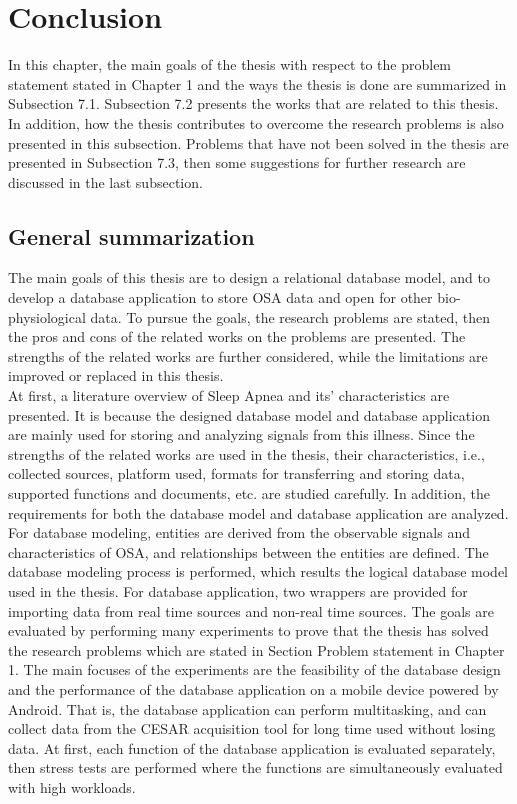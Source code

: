 
\chapter{Conclusion}%

\label{Chapter7} %
In this chapter, the main goals of the thesis with respect to the problem statement stated in Chapter 1 and the ways the thesis is done are summarized in Subsection 7.1. Subsection 7.2 presents the works that are related to this thesis. In addition, how the thesis contributes to overcome the research problems is also presented in this subsection. Problems that have not been solved in the thesis are presented in Subsection 7.3, then some suggestions for further research are discussed in the last subsection.

\section{General summarization}
The main goals of this thesis are to design a relational database model, and to develop a database application to store OSA data and open for other bio-physiological data. To pursue the goals, the research problems are stated, then the pros and cons of the related works on the problems are presented. The strengths of the related works are further considered, while the limitations are improved or replaced in this thesis.\\
At first, a literature overview of Sleep Apnea and its’ characteristics are presented. It is because the designed database model and database application are mainly used for storing and analyzing signals from this illness. Since the strengths of the related works are used in the thesis, their characteristics, i.e., collected sources, platform used, formats for transferring and storing data, supported functions and documents, etc. are studied carefully. In addition, the requirements for both the database model and database application are analyzed. For database modeling, entities are derived from the observable signals and characteristics of OSA, and relationships between the entities are defined. The database modeling process is performed, which results the logical database model used in the thesis. For database application, two wrappers are provided for importing data from real time sources and non-real time sources. The goals are evaluated by performing many experiments to prove that the thesis has solved the research problems which are stated in Section Problem statement in Chapter 1. The main focuses of the experiments are the feasibility of the database design and the performance of the database application on a mobile device powered by Android. That is, the database application can perform multitasking, and can collect data from the CESAR acquisition tool for long time used without losing data. At first, each function of the database application is evaluated separately, then stress tests are performed where the functions are simultaneously evaluated with high workloads.

